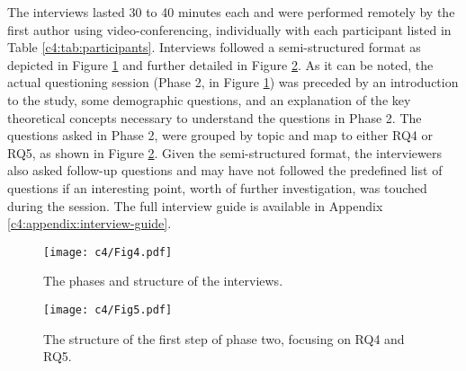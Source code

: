 The interviews lasted 30 to 40 minutes each and were performed remotely by the first author using video-conferencing, individually with each participant listed in Table \ref{c4:tab:participants}.
Interviews followed a semi-structured format \cite{Runeson2012} as depicted in Figure \ref{c4:fig:interview-phases} and further detailed in Figure \ref{c4:fig:interview-questions-sub-phases}.
As it can be noted, the actual questioning session (Phase 2, in Figure \ref{c4:fig:interview-phases}) was preceded by an introduction to the study, some demographic questions, and an explanation of the key theoretical concepts necessary to understand the questions in Phase 2.
The questions asked in Phase 2, were grouped by topic and map to either RQ4 or RQ5, as shown in Figure \ref{c4:fig:interview-questions-sub-phases}.
Given the semi-structured format, the interviewers also asked follow-up questions and may have not followed the predefined list of questions if an interesting point, worth of further investigation, was touched during the session.
The full interview guide is available in Appendix \ref{c4:appendix:interview-guide}.

\begin{figure}
    \centering
    \texttt{[image: c4/Fig4.pdf]}
    \caption{The phases and structure of the interviews.}\label{c4:fig:interview-phases}
\end{figure}

\begin{figure}
    \centering
    \texttt{[image: c4/Fig5.pdf]}
    \caption{The structure of the first step of phase two, focusing on RQ4 and RQ5.}\label{c4:fig:interview-questions-sub-phases}
\end{figure}

